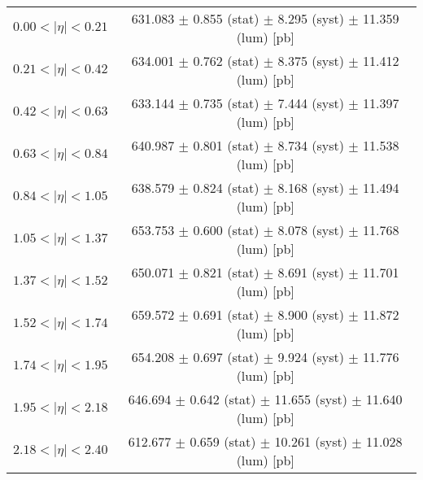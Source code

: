 \begin{tabular}{lc}
\hline
$0.00 < |\eta| <0.21$          & 631.083 $\pm$ 0.855 (stat) $\pm$ 8.295 (syst) $\pm$ 11.359 (lum) [pb]  \\
$0.21 < |\eta| <0.42$          & 634.001 $\pm$ 0.762 (stat) $\pm$ 8.375 (syst) $\pm$ 11.412 (lum) [pb]  \\
$0.42 < |\eta| <0.63$          & 633.144 $\pm$ 0.735 (stat) $\pm$ 7.444 (syst) $\pm$ 11.397 (lum) [pb]  \\
$0.63 < |\eta| <0.84$          & 640.987 $\pm$ 0.801 (stat) $\pm$ 8.734 (syst) $\pm$ 11.538 (lum) [pb]  \\
$0.84 < |\eta| <1.05$          & 638.579 $\pm$ 0.824 (stat) $\pm$ 8.168 (syst) $\pm$ 11.494 (lum) [pb]  \\
$1.05 < |\eta| <1.37$          & 653.753 $\pm$ 0.600 (stat) $\pm$ 8.078 (syst) $\pm$ 11.768 (lum) [pb]  \\
$1.37 < |\eta| <1.52$          & 650.071 $\pm$ 0.821 (stat) $\pm$ 8.691 (syst) $\pm$ 11.701 (lum) [pb]  \\
$1.52 < |\eta| <1.74$          & 659.572 $\pm$ 0.691 (stat) $\pm$ 8.900 (syst) $\pm$ 11.872 (lum) [pb]  \\
$1.74 < |\eta| <1.95$          & 654.208 $\pm$ 0.697 (stat) $\pm$ 9.924 (syst) $\pm$ 11.776 (lum) [pb]  \\
$1.95 < |\eta| <2.18$          & 646.694 $\pm$ 0.642 (stat) $\pm$ 11.655 (syst) $\pm$ 11.640 (lum) [pb]  \\
$2.18 < |\eta| <2.40$          & 612.677 $\pm$ 0.659 (stat) $\pm$ 10.261 (syst) $\pm$ 11.028 (lum) [pb]  \\
\hline
\end{tabular}
